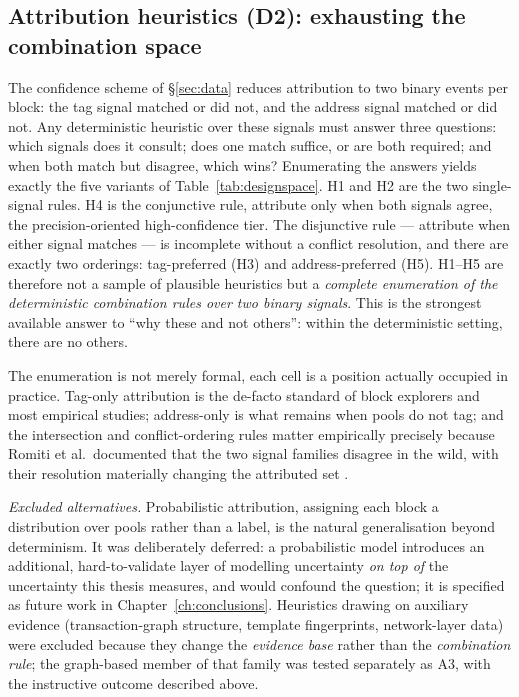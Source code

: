 \documentclass[logo,msc]{infthesis}           %
\begin{document}
\subsection{Attribution heuristics (D2): exhausting the combination space}
 
The confidence scheme of \S\ref{sec:data} reduces attribution to two binary
events per block: the tag signal matched or did not, and the address signal
matched or did not. Any deterministic heuristic over these signals must answer
three questions: which signals does it consult; does one match suffice, or are
both required; and when both match but disagree, which wins? Enumerating the
answers yields exactly the five variants of Table~\ref{tab:designspace}. H1
and H2 are the two single-signal rules. H4 is the conjunctive rule,
attribute only when both signals agree, the precision-oriented
high-confidence tier. The disjunctive rule --- attribute when either signal
matches --- is incomplete without a conflict resolution, and there are exactly
two orderings: tag-preferred (H3) and address-preferred (H5). H1--H5 are
therefore not a sample of plausible heuristics but a \emph{complete
enumeration of the deterministic combination rules over two binary signals}.
This is the strongest available answer to ``why these and not others'': within
the deterministic setting, there are no others.
 
The enumeration is not merely formal, each cell is a position actually
occupied in practice. Tag-only attribution is the de-facto standard of block
explorers and most empirical studies; address-only is what remains when pools
do not tag; and the intersection and conflict-ordering rules matter
empirically precisely because Romiti et al.\ documented that the two signal
families disagree in the wild, with their resolution materially changing the
attributed set \cite{romiti2019deep}.
 
\emph{Excluded alternatives.} Probabilistic attribution, assigning each
block a distribution over pools rather than a label, is the natural
generalisation beyond determinism. It was deliberately deferred: a
probabilistic model introduces an additional, hard-to-validate layer of
modelling uncertainty \emph{on top of} the uncertainty this thesis measures,
and would confound the question; it is specified as future work in
Chapter~\ref{ch:conclusions}. Heuristics drawing on auxiliary evidence
(transaction-graph structure, template fingerprints, network-layer data) were
excluded because they change the \emph{evidence base} rather than the
\emph{combination rule}; the graph-based member of that family was tested
separately as A3, with the instructive outcome described above.
 
\end{document}
